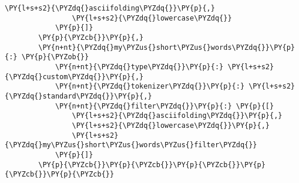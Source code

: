 \begin{Verbatim}[commandchars=\\\{\}]
                \PY{l+s+s2}{\PYZdq{}asciifolding\PYZdq{}}\PY{p}{,}
                \PY{l+s+s2}{\PYZdq{}lowercase\PYZdq{}}
            \PY{p}{]}
        \PY{p}{\PYZcb{}}\PY{p}{,}
        \PY{n+nt}{\PYZdq{}my\PYZus{}short\PYZus{}words\PYZdq{}}\PY{p}{:} \PY{p}{\PYZob{}}
            \PY{n+nt}{\PYZdq{}type\PYZdq{}}\PY{p}{:} \PY{l+s+s2}{\PYZdq{}custom\PYZdq{}}\PY{p}{,}
            \PY{n+nt}{\PYZdq{}tokenizer\PYZdq{}}\PY{p}{:} \PY{l+s+s2}{\PYZdq{}standard\PYZdq{}}\PY{p}{,}
            \PY{n+nt}{\PYZdq{}filter\PYZdq{}}\PY{p}{:} \PY{p}{[}
                \PY{l+s+s2}{\PYZdq{}asciifolding\PYZdq{}}\PY{p}{,}
                \PY{l+s+s2}{\PYZdq{}lowercase\PYZdq{}}\PY{p}{,}
                \PY{l+s+s2}{\PYZdq{}my\PYZus{}short\PYZus{}words\PYZus{}filter\PYZdq{}}
            \PY{p}{]}
        \PY{p}{\PYZcb{}}\PY{p}{\PYZcb{}}\PY{p}{\PYZcb{}}\PY{p}{\PYZcb{}}\PY{p}{\PYZcb{}}
\end{Verbatim}
